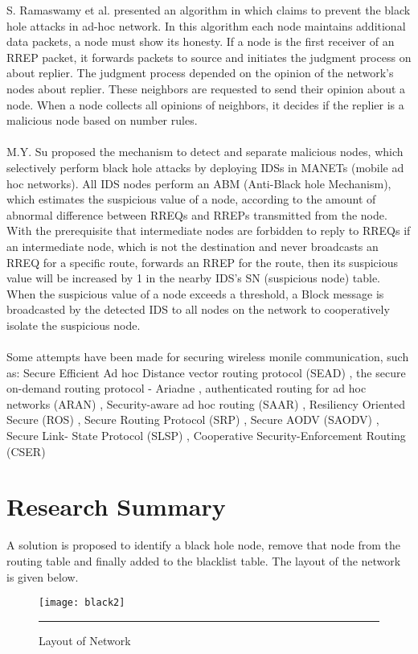 S. Ramaswamy et al. presented an algorithm in \cite{qa:3} which
claims to prevent the black hole attacks in ad-hoc
network. In this algorithm each node maintains additional data packets, a node must show its honesty. If a node is the
first receiver of an RREP packet, it forwards packets to source
and initiates the judgment process on about replier. The judgment
process depended on the opinion of the network’s nodes about
replier. These neighbors are requested to send their opinion
about a node. When a node collects all opinions of neighbors,
it decides if the replier is a malicious node based on number
rules.\\\\

M.Y. Su \cite{qa:4} proposed the mechanism to detect and separate
malicious nodes, which selectively perform black hole attacks
by deploying IDSs in MANETs (mobile ad hoc networks). All
IDS nodes perform an ABM (Anti-Black hole Mechanism),
which estimates the suspicious value of a node, according to
the amount of abnormal difference between RREQs and
RREPs transmitted from the node. With the prerequisite that
intermediate nodes are forbidden to reply to RREQs if an
intermediate node, which is not the destination and never
broadcasts an RREQ for a specific route, forwards an RREP for
the route, then its suspicious value will be increased by 1 in
the nearby IDS’s SN (suspicious node) table. When the
suspicious value of a node exceeds a threshold, a Block
message is broadcasted by the detected IDS to all nodes on the
network to cooperatively isolate the suspicious node.\\\\

Some attempts have been made for securing wireless monile communication, such as: Secure Efficient Ad hoc Distance vector
routing protocol (SEAD) \cite{qa:5}, the secure on-demand routing
protocol - Ariadne \cite{qa:6}, authenticated routing for ad hoc
networks (ARAN)  \cite{qa:7}, Security-aware ad hoc routing (SAAR)
\cite{qa:8}, Resiliency Oriented Secure (ROS)  \cite{qa:9}, Secure Routing
Protocol (SRP)  \cite{qa:10}, Secure AODV (SAODV)  \cite{qa:11}, Secure Link-
State Protocol (SLSP)  \cite{qa:12}, Cooperative Security-Enforcement
Routing (CSER)  \cite{qa:13}

\section{Research Summary}

A solution is proposed to identify a black hole
node, remove that node from the routing table and finally added to
the blacklist table.
The layout of the network is given below.
\begin{figure}[htbp]
	\centering
	\texttt{[image: black2]}
	\rule{35em}{0.5pt}
	\caption[Layout of network]{Layout of Network}
	\label{fig:layout}
\end{figure}


